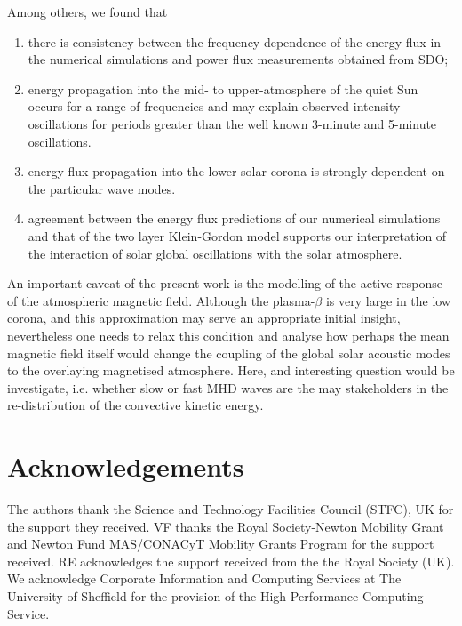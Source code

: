 \documentclass[preprint,authoryear,12pt]{elsarticle}
\begin{document}
Among others, we found that
   \begin{enumerate}
      \item there is consistency between the frequency-dependence of the energy flux in the numerical simulations and power 
      flux measurements obtained from SDO;
      \item energy propagation into the mid- to upper-atmosphere of the quiet Sun occurs for a range of frequencies and may explain observed intensity oscillations for periods greater than the well known 3-minute and 5-minute oscillations.  
      \item energy flux propagation into the lower solar corona is strongly dependent on the particular wave modes.
 \item agreement between the energy flux predictions of our numerical simulations and that of the two layer 
      Klein-Gordon model supports our interpretation of the interaction of solar global oscillations with the solar atmosphere.
   \end{enumerate}

An important caveat of the present work is the modelling of the active response of the atmospheric magnetic field. Although the plasma-$\beta$ is very large in the low corona, and this approximation may serve an appropriate initial insight, nevertheless one needs to relax this condition and analyse how perhaps the mean magnetic field itself would change the coupling of the global solar acoustic modes to the overlaying magnetised atmosphere. Here, and interesting question would be investigate, i.e. whether slow or fast MHD waves are the may stakeholders in the re-distribution of the convective kinetic energy.  

\section{Acknowledgements}
 The authors thank the Science and Technology Facilities Council (STFC), UK for the support they received. 
VF thanks the Royal Society-Newton Mobility Grant and Newton Fund MAS/CONACyT Mobility
Grants Program for the support received. RE acknowledges the support received from the the Royal Society (UK). 
We acknowledge Corporate Information and Computing Services at The University of Sheffield for the provision of the High Performance Computing Service.

\begin{thebibliography}{}


%

%
%


\end{thebibliography}
\end{document}
